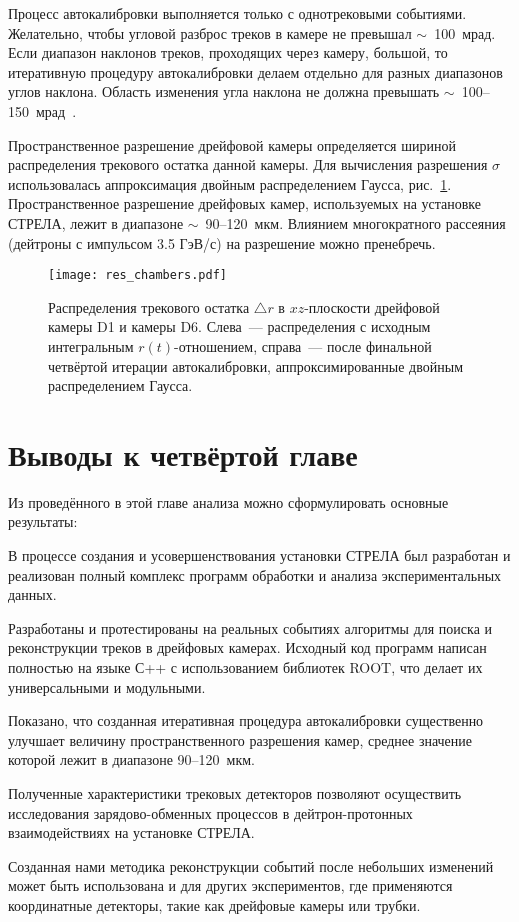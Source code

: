 Процесс автокалибровки выполняется только с однотрековыми событиями. Желательно,
чтобы угловой разброс треков в камере не превышал $\sim$~100~мрад. Если диапазон
наклонов треков, проходящих через камеру, большой, то итеративную процедуру
автокалибровки делаем отдельно для разных диапазонов углов наклона. Область
изменения угла наклона не должна превышать
$\sim$~100--150~мрад~\cite{gla_mucha08_2}.

Пространственное разрешение дрейфовой камеры определяется шириной распределения
трекового остатка данной камеры. Для вычисления разрешения $\sigma$
использовалась аппроксимация двойным распределением Гаусса,
рис.~\ref{fig:res_chambers}. Пространственное разрешение дрейфовых камер,
используемых на установке СТРЕЛА, лежит в диапазоне $\sim$~90--120~мкм.
Влиянием многократного рассеяния (дейтроны с импульсом 3.5 ГэВ/с) на разрешение
можно пренебречь.

\begin{figure}[!h]
  \centering
  \texttt{[image: res\_chambers.pdf]}
  \caption{Распределения трекового остатка $\triangle r$ в $xz$-плоскости
    дрейфовой камеры D1 и камеры D6. Слева~--- распределения с исходным
    интегральным $r(t)$-отношением, справа~--- после финальной четвёртой
    итерации автокалибровки, аппроксимированные двойным распределением Гаусса.}
  \label{fig:res_chambers}
\end{figure}

\section{Выводы к четвёртой главе}
Из проведённого в этой главе анализа можно сформулировать основные результаты:
\begin{list}{}{\leftmargin=1em}
\item В процессе создания и усовершенствования установки СТРЕЛА был разработан
  и реализован полный комплекс программ обработки и анализа экспериментальных
  данных.
\item Разработаны и протестированы на реальных событиях алгоритмы для поиска и
  реконструкции треков в дрейфовых камерах. Исходный код программ написан
  полностью на языке С++ с использованием библиотек ROOT, что делает их
  универсальными и модульными.
\item Показано, что созданная итеративная процедура автокалибровки существенно
  улучшает величину пространственного разрешения камер, среднее значение которой
  лежит в диапазоне 90--120~мкм.
\item Полученные характеристики трековых детекторов позволяют осуществить
  исследования зарядово-обменных процессов в дейтрон-протонных взаимодействиях
  на установке СТРЕЛА.
\item Созданная нами методика реконструкции событий после небольших изменений
  может быть использована и для других экспериментов, где применяются
  координатные детекторы, такие как дрейфовые камеры или трубки.
\end{list}

